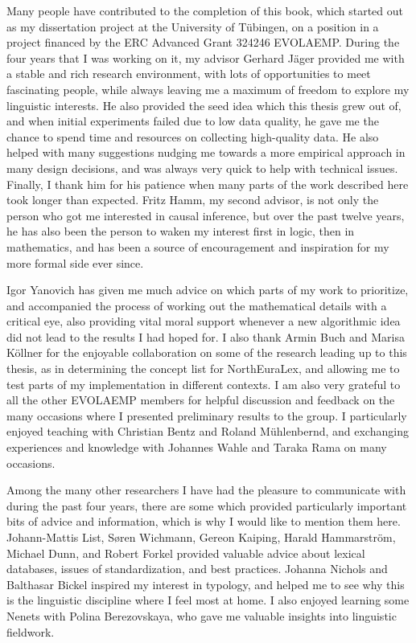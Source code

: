 \addchap{\lsAcknowledgementTitle} 

Many people have contributed to the completion of this book, which started out as my dissertation project at the University of T\"ubingen, on a position in a project financed by the ERC Advanced Grant 324246 EVOLAEMP. During the four years that I was working on it, my advisor Gerhard Jäger provided me with a stable and rich research environment, with lots of opportunities to meet fascinating people, while always leaving me a maximum of freedom to explore my linguistic interests. He also provided the seed idea which this thesis grew out of, and when initial experiments failed due to low data quality, he gave me the chance to spend time and resources on collecting high-quality data. He also helped with many suggestions nudging me towards a more empirical approach in many design decisions, and was always very quick to help with technical issues. Finally, I thank him for his patience when many parts of the work described here took longer than expected. Fritz Hamm, my second advisor, is not only the person who got me interested in causal inference, but over the past twelve years, he has also been the person to waken my interest first in logic, then in mathematics, and has been a source of encouragement and inspiration for my more formal side ever since.

Igor Yanovich has given me much advice on which parts of my work to prioritize, and accompanied the process of working out the mathematical details with a critical eye, also providing vital moral support whenever a new algorithmic idea did not lead to the results I had hoped for. I also thank Armin Buch and Marisa Köllner for the enjoyable collaboration on some of the research leading up to this thesis, as in determining the concept list for NorthEuraLex, and allowing me to test parts of my implementation in different contexts. I am also very grateful to all the other EVOLAEMP members for helpful discussion and feedback on the many occasions where I presented preliminary results to the group. I particularly enjoyed teaching with Christian Bentz and Roland Mühlenbernd, and exchanging experiences and knowledge with Johannes Wahle and Taraka Rama on many occasions.

Among the many other researchers I have had the pleasure to communicate with during the past four years, there are some which provided particularly important bits of advice and information, which is why I would like to mention them here. Johann-Mattis List, Søren Wichmann, Gereon Kaiping, Harald Hammarström, Michael Dunn, and Robert Forkel provided valuable advice about lexical databases, issues of standardization, and best practices. Johanna Nichols and Balthasar Bickel inspired my interest in typology, and helped me to see why this is the linguistic discipline where I feel most at home. I also enjoyed learning some Nenets with Polina Berezovskaya, who gave me valuable insights into linguistic fieldwork.

